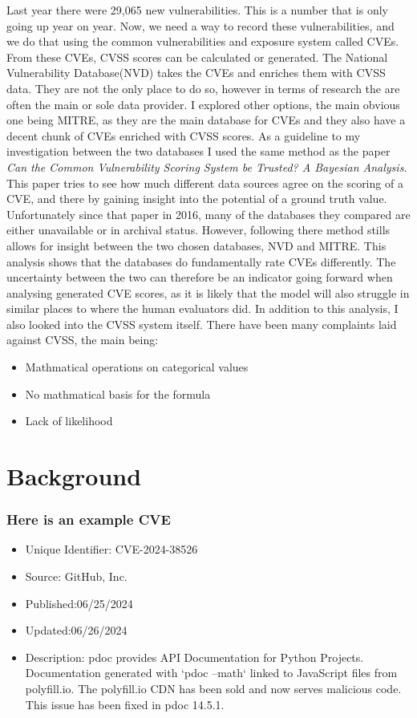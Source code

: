 \documentclass[12pt]{article}
\begin{document}
Last year there were 29,065 new vulnerabilities. This is a number that is only going
up year on year. Now, we need a way to record these vulnerabilities, and we do that using the common
vulnerabilities and exposure system called CVEs. From these CVEs, CVSS scores can be calculated or
generated. The National Vulnerability Database(NVD) takes the CVEs and enriches them with CVSS data.
They are not the only place to do so, however in terms of research the are often the main or sole
data provider. I explored other options, the main obvious one being MITRE, as they are the main
database for CVEs and they also have a decent chunk of CVEs enriched with CVSS scores. As a
guideline to my investigation between the two databases I used the same method as the paper
\textit{Can the Common Vulnerability Scoring System be Trusted? A Bayesian Analysis}.\cite{bayes}
This paper tries to see how much different data sources agree on the scoring of a CVE, and there by
gaining insight into the potential of a ground truth value. Unfortunately since that paper in 2016,
many of the databases they compared are either unavailable or in archival status. However, following
there method stills allows for insight between the two chosen databases, NVD and MITRE. This
analysis shows that the databases do fundamentally rate CVEs differently. The uncertainty between
the two can therefore be an indicator going forward when analysing generated CVE scores, as it is
likely that the model will also struggle in similar places to where the human evaluators did. In
addition to this analysis, I also looked into the CVSS system itself. There have been many
complaints laid against CVSS\cite{ubiquitous}\cite{improving_cvss}, the main being:

\begin{itemize}
	\item Mathmatical operations on categorical values
	\item No mathmatical basis for the formula
	\item Lack of likelihood
\end{itemize}




\section{Background}

\subsubsection*{Here is an example CVE}
\begin{itemize}
	\item   Unique Identifier: CVE-2024-38526
	\item   Source: GitHub, Inc.
	\item   Published:06/25/2024
	\item   Updated:06/26/2024
	\item   Description: pdoc provides API Documentation for Python Projects. Documentation generated with `pdoc --math` linked to JavaScript files from polyfill.io. The polyfill.io CDN has been sold and now serves malicious code. This issue has been fixed in pdoc 14.5.1.
\end{itemize}
\end{document}
